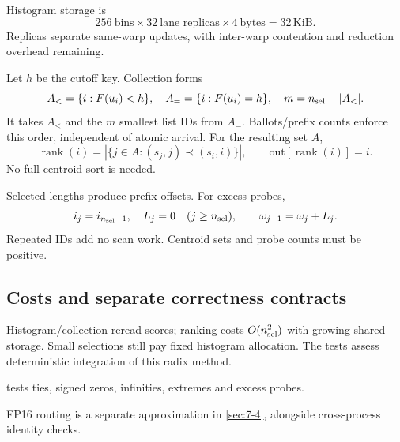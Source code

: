 Histogram storage is
\[
 256\ \text{bins}\times32\ \text{lane replicas}\times4\ \text{bytes}=32\,\mathrm{KiB}.
\]
Replicas separate same-warp updates, with inter-warp contention and reduction overhead remaining.

Let $h$ be the cutoff key. Collection forms
\[
 A_< =\{i:F(u_i)<h\},\quad A_= =\{i:F(u_i)=h\},\quad
 m=n_{\rm sel}-|A_<|.
\]
It takes $A_< $ and the $m$ smallest list IDs from $A_=$. Ballots/prefix counts enforce this order, independent of atomic arrival. For the resulting set $A$,
\[
 \operatorname{rank}(i)=|\{j\in A:(s_j,j)\prec(s_i,i)\}|,
 \qquad\mathrm{out}[\operatorname{rank}(i)]=i.
\]
No full centroid sort is needed.

Selected lengths produce prefix offsets. For excess probes,
\[
 i_j=i_{n_{\rm sel}-1},\quad L_j=0\quad(j\geq n_{\rm sel}),
 \qquad\omega_{j+1}=\omega_j+L_j.
\]
Repeated IDs add no scan work. Centroid sets and probe counts must be positive.

\subsection{Costs and separate correctness contracts}

Histogram/collection reread scores; ranking costs $O(n_{\rm sel}^2)$ with growing shared storage. Small selections still pay fixed histogram allocation. The tests assess deterministic integration of this radix method.

 tests ties, signed zeros, infinities, extremes and excess probes.

FP16 routing is a separate approximation in \cref{sec:7-4}, alongside cross-process identity checks.